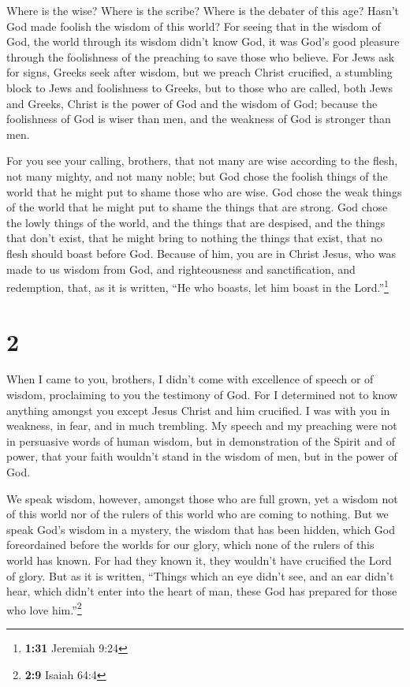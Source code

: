  Where is the wise? Where is the scribe? Where is the
debater of this age? Hasn't God made foolish the wisdom of this world?
 For seeing that in the wisdom of God, the world through
its wisdom didn't know God, it was God's good pleasure through the
foolishness of the preaching to save those who believe. 
For Jews ask for signs, Greeks seek after wisdom,  but we
preach Christ crucified, a stumbling block to Jews and foolishness to
Greeks,  but to those who are called, both Jews and
Greeks, Christ is the power of God and the wisdom of God;
 because the foolishness of God is wiser than men, and
the weakness of God is stronger than men.

 For you see your calling, brothers, that not many are
wise according to the flesh, not many mighty, and not many noble;
 but God chose the foolish things of the world that he
might put to shame those who are wise. God chose the weak things of the
world that he might put to shame the things that are strong.
 God chose the lowly things of the world, and the things
that are despised, and the things that don't exist, that he might bring
to nothing the things that exist,  that no flesh should
boast before God.  Because of him, you are in Christ
Jesus, who was made to us wisdom from God, and righteousness and
sanctification, and redemption,  that, as it is written,
``He who boasts, let him boast in the Lord.''\footnote{\textbf{1:31}
  Jeremiah 9:24}

\hypertarget{section-1}{%
\section{2}\label{section-1}}

 When I came to you, brothers, I didn't come with
excellence of speech or of wisdom, proclaiming to you the testimony of
God.  For I determined not to know anything amongst you
except Jesus Christ and him crucified.  I was with you in
weakness, in fear, and in much trembling.  My speech and
my preaching were not in persuasive words of human wisdom, but in
demonstration of the Spirit and of power,  that your faith
wouldn't stand in the wisdom of men, but in the power of God.

 We speak wisdom, however, amongst those who are full
grown, yet a wisdom not of this world nor of the rulers of this world
who are coming to nothing.  But we speak God's wisdom in a
mystery, the wisdom that has been hidden, which God foreordained before
the worlds for our glory,  which none of the rulers of
this world has known. For had they known it, they wouldn't have
crucified the Lord of glory.  But as it is written,
``Things which an eye didn't see, and an ear didn't hear, which didn't
enter into the heart of man, these God has prepared for those who love
him.''\footnote{\textbf{2:9} Isaiah 64:4}

